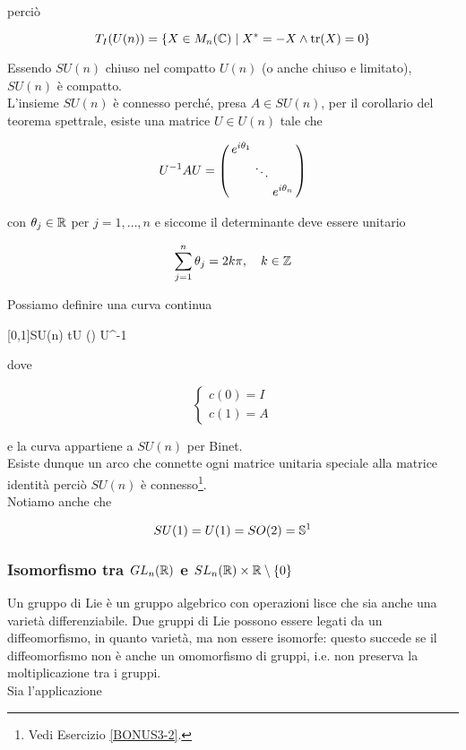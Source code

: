 perciò

\begin{equation}
	T_{I}(U(n)) = \{ X \in M_{n}(\C) \mid X^{*} = -X \wedge \tr(X) = 0 \}
\end{equation}

Essendo $ SU(n) $ chiuso nel compatto $ U(n) $ (o anche chiuso e limitato), $ SU(n) $ è compatto.\\
L'insieme $ SU(n) $ è connesso perché, presa $ A \in SU(n) $, per il corollario del teorema spettrale, esiste una matrice $ U \in U(n) $ tale che

\begin{equation}
	U^{-1} A U = %
	\smqty(\dmat{ e^{i \theta_{1}}, \ddots, e^{i \theta_{n}} })
\end{equation}

con $ \theta_{j} \in \R $ per $ j=1,\dots,n $ e siccome il determinante deve essere unitario

\begin{equation}
	\sum_{j=1}^{n} \theta_{j} = 2 k \pi \qcomma k \in \Z
\end{equation}

Possiamo definire una curva continua

%
	{[0,1]}{SU(n)}%
	{t}{U \smqty() U^{-1}}

dove

\begin{equation}
	\begin{cases}
		c(0) = I\\
		c(1) = A
	\end{cases}
\end{equation}

e la curva appartiene a $ SU(n) $ per Binet.\\
Esiste dunque un arco che connette ogni matrice unitaria speciale alla matrice identità perciò $ SU(n) $ è connesso\footnote{%
	Vedi Esercizio \ref{BONUS3-2}.%
}.\\
Notiamo anche che

\begin{equation}
	SU(1) = U(1) = SO(2) = \S^{1}
\end{equation}

\subsubsection{Isomorfismo tra $ GL_{n}(\R) $ e $ SL_{n}(\R) \times \R \setminus \{0\} $}

Un gruppo di Lie è un gruppo algebrico con operazioni lisce che sia anche una varietà differenziabile. Due gruppi di Lie possono essere legati da un diffeomorfismo, in quanto varietà, ma non essere isomorfe: questo succede se il diffeomorfismo non è anche un omomorfismo di gruppi, i.e. non preserva la moltiplicazione tra i gruppi.\\
Sia l'applicazione

